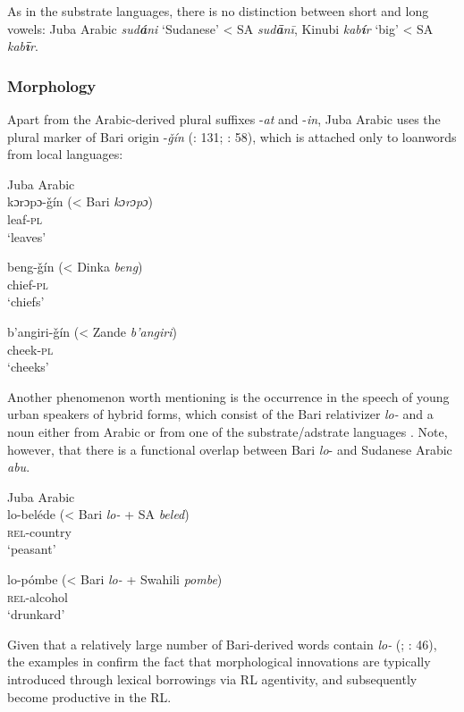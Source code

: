\documentclass[output=paper]{langsci/langscibook}
\begin{document}
As in the substrate languages, there is no distinction between short and long vowels: Juba Arabic \textit{sud\textbf{á}ni} ‘Sudanese’ < SA \textit{sud\textbf{ā}nī}, Kinubi \textit{kab\textbf{í}r} ‘big’ < SA \textit{kab\textbf{ī}r}.


 \subsubsection{Morphology}

Apart from the Arabic-derived plural suffixes -\textit{at} and -\textit{in}, Juba Arabic uses the plural marker of Bari origin -\textit{ǧín} (\citealt{Nakao2012}: 131; \citealt{Manfredi2014plural}: 58), which is attached only to loanwords from local languages:


\ea
{Juba Arabic \citep[58]{Manfredi2014plural}}\\
\ea
\gll kɔrɔpɔ-ǧín (\textup{< Bari} \textit{kɔrɔpɔ})\\
    leaf-\textsc{pl}\\
\glt       `leaves' 

\ex
\gll beng-ǧín (< Dinka \textit{beng}) \\
         chief-\textsc{pl}\\
\glt       `chiefs'


\ex
\gll  b'angiri-ǧín (< \textup{Zande} \textit{b'angiri}) \\
         cheek\textsc{-pl}\\
\glt       `cheeks' 
\z
\z

Another phenomenon worth mentioning is the occurrence in the speech of young urban speakers of hybrid forms, which consist of the Bari relativizer \textit{lo-} and a noun either from Arabic or from one of the substrate/adstrate languages \citep[131]{Nakao2012}. Note, however, that there is a functional overlap between Bari \textit{lo}- and Sudanese Arabic \textit{abu}.

\ea\label{ex:key:lo}
{Juba Arabic \citep[46]{Manfredi2017}}\\
\ea\gll lo-beléde (\textup{< Bari} \textit{lo-} \textup{+ SA} \textit{beled})\\
\textsc{rel}-country\\
\glt       `peasant'

\ex
\gll lo-pómbe (< Bari \textit{lo-} + \textup{Swahili} \textit{pombe})\\
 \textsc{rel}-alcohol\\
\glt    `drunkard'
\z
\z

Given that a relatively large number of Bari-derived words contain \textit{lo-} (\citealt{Miller1989}; \citealt{Manfredi2017}: 46), the examples in  confirm the fact that morphological innovations are typically introduced through lexical borrowings via RL agentivity, and subsequently become productive in the RL. 
\end{document}
